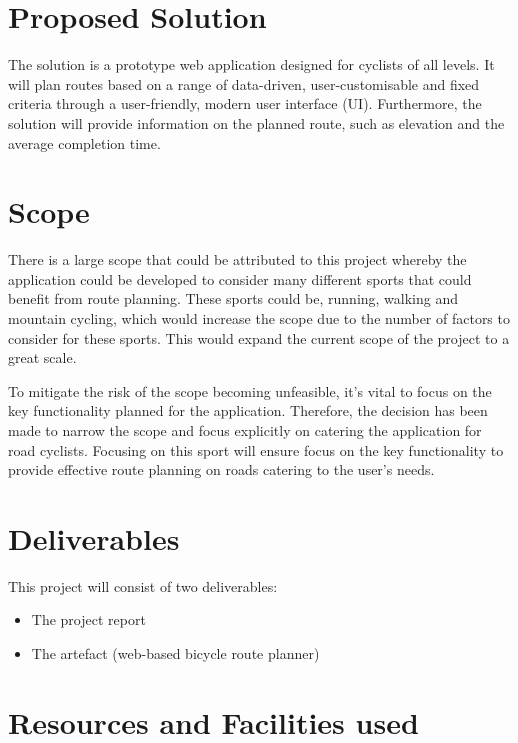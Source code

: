 \section{Proposed Solution}
\label{intro:proposedsolution}

The solution is a prototype web application designed for cyclists of all levels. It will plan routes based on a range of data-driven, user-customisable and fixed criteria through a user-friendly, modern user interface (UI). Furthermore, the solution will provide information on the planned route, such as elevation and the average completion time.

\section{Scope}
\label{intro:scope}

There is a large scope that could be attributed to this project whereby the application could be developed to consider many different sports that could benefit from route planning. These sports could be, running, walking and mountain cycling, which would increase the scope due to the number of factors to consider for these sports. This would expand the current scope of the project to a great scale.

To mitigate the risk of the scope becoming unfeasible, it's vital to focus on the key functionality planned for the application. Therefore, the decision has been made to narrow the scope and focus explicitly on catering the application for road cyclists. Focusing on this sport will ensure focus on the key functionality to provide effective route planning on roads catering to the user's needs.

\section{Deliverables}
\label{intro:deliverables}

This project will consist of two deliverables:
\begin{itemize}
    \item The project report
    \item The artefact (web-based bicycle route planner)
\end{itemize}

\section{Resources and Facilities used}
\label{intro:resourcesandfacilities}

